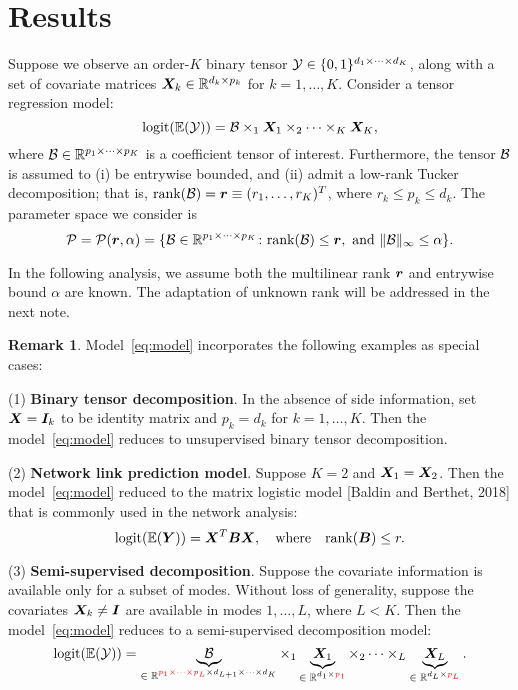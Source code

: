 \documentclass[11pt]{article}
\theoremstyle{plain}
\theoremstyle{definition}
\newtheorem{rmk}{Remark}
\newcommand*{\KeepStyleUnderBrace}[1]{%
  \mathop{%
    \mathchoice
    {\underbrace{\displaystyle#1}}%
    {\underbrace{\textstyle#1}}%
    {\underbrace{\scriptstyle#1}}%
    {\underbrace{\scriptscriptstyle#1}}%
  }\limits
}
\begin{document}
\section{Results}
Suppose we observe an order-$K$ binary tensor $\mathcal{Y}\in\{0,1\}^{d_1\times \cdots \times d_K}$, along with a set of covariate matrices $\bm X_k\in\mathbb{R}^{d_k\times p_k}$ for $k=1,\ldots,K$. Consider a tensor regression model:
\begin{equation}\label{eq:model}
\text{logit}(\mathbb{E}(\mathcal{Y}))=\mathcal{B}\times_1\bm X_1\times_2\cdots\times_K \bm X_K,
\end{equation}
where $\mathcal{B}\in \mathbb{R}^{p_1\times \cdots \times p_K}$ is a coefficient tensor of interest. Furthermore, the tensor $\mathcal{B}$ is assumed to (i) be entrywise bounded,  and (ii) admit a low-rank Tucker decomposition; that is, $\text{rank}(\mathcal{B})=\bm{r}\equiv(r_1,\ldots,r_K)^T$, where $r_k\leq p_k\leq d_k$. The parameter space we consider is
\[
\mathcal{P}=\mathcal{P}(\bm{r},\alpha)=\{ \mathcal{B} \in \mathbb{R}^{p_1\times \cdots \times p_K}\colon \text{rank}(\mathcal{B})\leq \bm{r}, \ \text{and} \ \lVert\mathcal{B}\rVert_\infty\leq \alpha\}.
\]

In the following analysis, we assume both the multilinear rank $\bm{r}$ and entrywise bound $\alpha$ are known. The adaptation of unknown rank will be addressed in the next note. 

\begin{rmk}
Model~\eqref{eq:model} incorporates the following examples as special cases:

(1) {\bf Binary tensor decomposition}. In the absence of side information, set $\bm X=\bm I_k$ to be identity matrix and $p_k=d_k$ for $k=1,\ldots,K$. Then the model~\eqref{eq:model} reduces to unsupervised binary tensor decomposition.

(2) {\bf Network link prediction model}. Suppose $K=2$ and $\bm X_1=\bm X_2$. Then the model~\eqref{eq:model} reduced to the matrix logistic model [Baldin and Berthet, 2018] that is commonly used in the network analysis:
\[
\text{logit}(\mathbb{E}(\bm Y))=\bm X^T\bm B\bm X,\quad \text{where}\quad \text{rank}(\bm B)\leq r. 
\]

(3) {\bf Semi-supervised decomposition}. Suppose the covariate information is available only for a subset of modes. Without loss of generality, suppose the covariates $\bm X_k\neq \bm I$ are available in modes $1,\ldots,L$, where $L< K$. Then the model~\eqref{eq:model} reduces to a semi-supervised decomposition model:
\[
\text{logit}(\mathbb{E}(\tY))=\KeepStyleUnderBrace{\tB}_{\text{$\in\mathbb{R}^{{\color{red}p_1\times \cdots\times p_L}\times d_{L+1}\times \cdots \times  d_K}$}} \times_1 \KeepStyleUnderBrace{\mX_1}_{\text{$\in \mathbb{R}^{d_1\times {\color{red}p_1}}$}}\times_2\cdots\times_L\KeepStyleUnderBrace{\mX_L}_{\text{$\in \mathbb{R}^{d_L \times {\color{red}p_L}}$}}.
\] 
\end{rmk}
\end{document}
